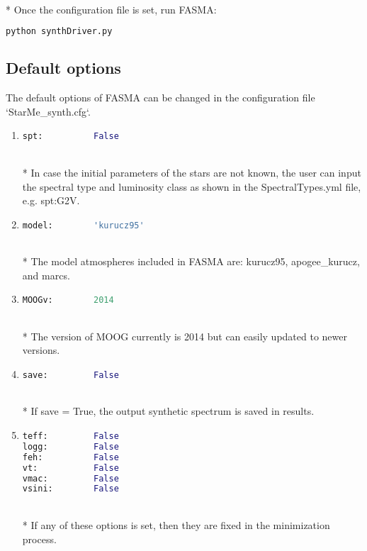 \documentclass[a4paper,10pt]{article}
\begin{document}
\\*
Once the configuration file is set, run FASMA: 
\begin{lstlisting}[language=Python]
python synthDriver.py
\end{lstlisting} 


\subsection{Default options}

The default options of FASMA can be changed in the configuration file `StarMe\_synth.cfg`.
\begin{enumerate}
 \item 
\begin{lstlisting}[language=Python]
spt:          False 

\end{lstlisting} 
\\*
In case the initial parameters of the stars are not known, the user can input the spectral type and luminosity class as shown in the SpectralTypes.yml file, e.g. spt:G2V.

\item
\begin{lstlisting}[language=Python]
model:        'kurucz95' 
\end{lstlisting} 
\\*
The model atmospheres included in FASMA are: kurucz95, apogee\_kurucz, and marcs.

\item
\begin{lstlisting}[language=Python]
MOOGv:        2014 
\end{lstlisting} 
\\*
The version of MOOG currently is 2014 but can easily updated to newer versions.

\item
\begin{lstlisting}[language=Python]
save:         False 
\end{lstlisting} 
\\*
If save = True, the output synthetic spectrum is saved in results.

\item
\begin{lstlisting}[language=Python]
teff:         False 
logg:         False 
feh:          False 
vt:           False 
vmac:         False 
vsini:        False 
\end{lstlisting} 
\\*
If any of these options is set, then they are fixed in the minimization process.


\end{enumerate}
\end{document}
